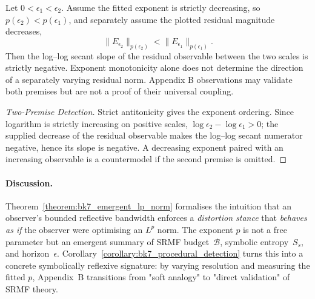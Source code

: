 \begin{corollary}
\label{corollary:bk7_procedural_detection}
Let $0<\epsilon_1<\epsilon_2$.  Assume the fitted exponent is strictly
decreasing, so $p(\epsilon_2)<p(\epsilon_1)$, and separately assume the plotted
residual magnitude decreases,
\[
 \lVert E_{\epsilon_2}\rVert_{p(\epsilon_2)}
 <\lVert E_{\epsilon_1}\rVert_{p(\epsilon_1)}.
\]
Then the log--log secant slope of the residual observable between the two
scales is strictly negative.  Exponent monotonicity alone does not determine
the direction of a separately varying residual norm.  Appendix B observations
may validate both premises but are not a proof of their universal coupling.
\end{corollary}
\begin{proof}[Two-Premise Detection]
\label{proof:bk7_lp_norm_monotonicity}
\leavevmode
Strict antitonicity gives the exponent ordering.  Since logarithm is strictly
increasing on positive scales, $\log\epsilon_2-\log\epsilon_1>0$; the supplied
decrease of the residual observable makes the log--log secant numerator
negative, hence its slope is negative.  A decreasing exponent paired with an
increasing observable is a countermodel if the second premise is omitted.
\end{proof}
\paragraph{Discussion.}
Theorem~\ref{theorem:bk7_emergent_lp_norm} formalises the intuition that an
observer's bounded reflective bandwidth enforces a \emph{distortion
stance} that \emph{behaves as if} the observer were optimising an
$L^{p}$ norm.  The exponent \(p\) is not a free parameter but an
emergent summary of SRMF budget~\(\mathcal{B}\), symbolic entropy~\(S_{s}\),
and horizon~\(\epsilon\).
Corollary~\ref{corollary:bk7_procedural_detection} turns this into a concrete
symbolically reflexive signature: by varying resolution and measuring the fitted
$p$, Appendix~B transitions from "soft analogy" to
"direct validation" of SRMF theory.

